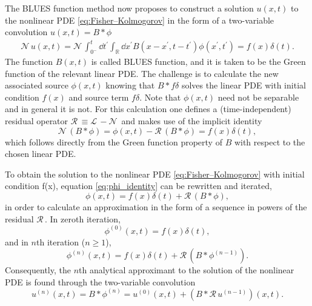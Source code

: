 \documentclass[amsmath,amssymb,amsfonts,aps,pre,preprint,superscriptaddress,bibnotes,showpacs,showkeys,longbibliography]{revtex4-1}
\newcommand*{\lop}{\mathcal{L}\,}
\newcommand*{\nlop}{\mathcal{N}\,}
\newcommand*{\rop}{\mathcal{R}\,}
\begin{document}
The BLUES function method now proposes to construct a solution $u(x, t)$ to the nonlinear PDE \eqref{eq:Fisher–Kolmogorov} in the form of a two-variable convolution $u(x, t) = B * \phi$
\begin{align}
    \label{eq:rewriten_nonlinear_operator_delta_u}
	\nlop u(x, t)=\nlop\int_{0^{-}}^{t} \dd{t^{\prime}} \int_{\mathbb{R}} \dd{x^{\prime}} B\left(x-x^{\prime}, t-t^{\prime}\right) \phi\left(x^{\prime}, t^{\prime}\right)=f(x) \delta(t).
\end{align}
The function $B(x, t)$ is called BLUES function, and it is taken to be the Green function of the relevant linear PDE. The challenge is to calculate the new associated source $\phi(x,t)$ knowing that $B \ast f \delta$ solves the linear PDE with initial condition $f(x)$ and source term $f \delta$. Note that $\phi(x,t)$ need not be separable and in general it is not. For this calculation one defines a (time-independent) residual operator $\rop \equiv \lop - \nlop$ and makes use of the implicit identity
\begin{equation}
    \label{eq:phi_identity}
    \nlop (B\ast\phi) = \phi(x,t) - \rop (B\ast\phi) = f(x)\delta(t), 
\end{equation}
which follows directly from the Green function property of $B$ with respect to the chosen linear PDE.

To obtain the solution to the nonlinear PDE \eqref{eq:Fisher–Kolmogorov} with initial condition f(x), equation \eqref{eq:phi_identity} can be rewritten and iterated,
\begin{equation}
    \label{eq:phi_identity_re}
  \phi(x,t)  = f(x)\delta(t) +  \rop (B\ast\phi), 
\end{equation}
 in order to calculate an approximation in the form of a sequence in powers of the residual $\rop$. In zeroth iteration, 
\begin{equation}
    \label{eq:zeroth_order}
    \phi^{(0)}(x,t) = f(x) \delta (t),
\end{equation}
and in $n$th iteration ($n\geq1$), 
\begin{equation}
    \label{eq:nth_order}
    \phi^{(n)}(x,t) = f(x) \delta (t) + \rop (B \ast \phi^{(n-1)}).
\end{equation}
Consequently, the $n$th analytical approximant to the solution of the nonlinear PDE is found through the two-variable convolution
\begin{equation}
    \label{eq:nth_order_u}
    u^{(n)}(x,t) = B \ast \phi^{(n)} = u^{(0)}(x,t) + (B\ast \rop u^{(n-1)})(x,t).
\end{equation}
\end{document}
